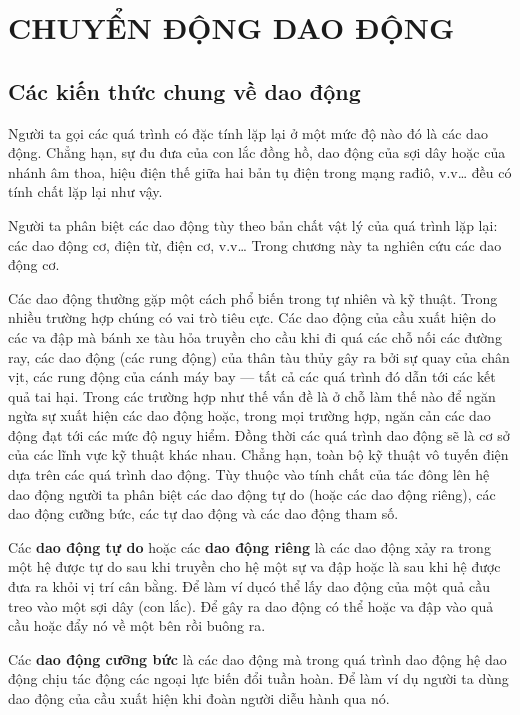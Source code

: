 

\chapter{CHUYỂN ĐỘNG DAO ĐỘNG}\label{chap:7}

\section{Các kiến thức chung về dao động}\label{sec:7_1}

Người ta gọi các quá trình có đặc tính lặp lại ở một mức độ nào đó là các dao động. Chẳng hạn, sự đu đưa của con lắc đồng hồ, dao động của sợi dây hoặc của nhánh âm thoa, hiệu điện thế giữa hai bản tụ điện trong mạng rađiô, v.v… đều có tính chất lặp lại như vậy.

Người ta phân biệt các dao động tùy theo bản chất vật lý của quá trình lặp lại: các dao động cơ, điện từ, điện cơ, v.v… Trong chương này ta nghiên cứu các dao động cơ.

Các dao động thường gặp một cách phổ biến trong tự nhiên và kỹ thuật. Trong nhiều trường hợp chúng có vai trò tiêu cực. Các dao động của cầu xuất hiện do các va đập mà bánh xe tàu hỏa truyền cho cầu khi đi quá các chỗ nối các đường ray, các dao động (các rung động) của thân tàu thủy gây ra bởi sự quay của chân vịt, các rung động của cánh máy bay — tất cả các quá trình đó dẫn tới các kết quả tai hại. Trong các trường hợp như thế vấn đề là ở chỗ làm thế nào để ngăn ngừa sự xuất hiện các dao động hoặc, trong mọi trường hợp, ngăn cản các dao động đạt tới các mức độ nguy hiểm.
Đồng thời các quá trình dao động sẽ là cơ sở của các lĩnh vực kỹ thuật khác nhau. Chẳng hạn, toàn bộ kỹ thuật vô tuyến điện dựa trên các quá trình dao động. Tùy thuộc vào tính chất của tác đông lên hệ dao động người ta phân biệt các dao động tự do (hoặc các dao động riêng), các dao động cưỡng bức, các tự dao động và các dao động tham số.

Các \textbf{dao động tự do} hoặc các \textbf{dao động riêng} là các dao động xảy ra trong một hệ được tự do sau khi truyền cho hệ một sự va đập hoặc là sau khi hệ được đưa ra khỏi vị trí cân bằng. Để làm ví dụcó thể lấy dao động của một quả cầu treo vào một sợi dây (con lắc). Để gây ra dao động có thể hoặc va đập vào quả cầu hoặc đẩy nó về một bên rồi buông ra.

Các \textbf{dao động cưỡng bức} là các dao động mà trong quá trình dao động hệ dao động chịu tác động các ngoại lực biến đổi tuần hoàn. Để làm ví dụ người ta dùng dao động của cầu xuất hiện khi đoàn người diễu hành qua nó.

